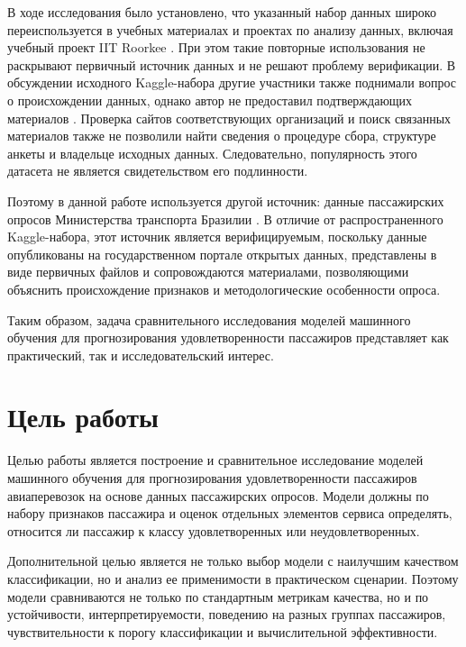 \documentclass[14pt,a4paper]{extreport}
\begin{document}
В ходе исследования было установлено, что указанный набор данных широко переиспользуется в учебных материалах и проектах по анализу данных, включая учебный проект IIT Roorkee \cite{iit-roorkee-project}. При этом такие повторные использования не раскрывают первичный источник данных и не решают проблему верификации. В обсуждении исходного Kaggle-набора другие участники также поднимали вопрос о происхождении данных, однако автор не предоставил подтверждающих материалов \cite{kaggle-source-discussion}. Проверка сайтов соответствующих организаций и поиск связанных материалов также не позволили найти сведения о процедуре сбора, структуре анкеты и владельце исходных данных. Следовательно, популярность этого датасета не является свидетельством его подлинности.

Поэтому в данной работе используется другой источник: данные пассажирских опросов Министерства транспорта Бразилии \cite{brazil-data}. В отличие от распространенного Kaggle-набора, этот источник является верифицируемым, поскольку данные опубликованы на государственном портале открытых данных, представлены в виде первичных файлов и сопровождаются материалами, позволяющими объяснить происхождение признаков и методологические особенности опроса.

Таким образом, задача сравнительного исследования моделей машинного обучения для прогнозирования удовлетворенности пассажиров представляет как практический, так и исследовательский интерес.

\section{Цель работы}
Целью работы является построение и сравнительное исследование моделей машинного обучения для прогнозирования удовлетворенности пассажиров авиаперевозок на основе данных пассажирских опросов. Модели должны по набору признаков пассажира и оценок отдельных элементов сервиса определять, относится ли пассажир к классу удовлетворенных или неудовлетворенных.

Дополнительной целью является не только выбор модели с наилучшим качеством классификации, но и анализ ее применимости в практическом сценарии. Поэтому модели сравниваются не только по стандартным метрикам качества, но и по устойчивости, интерпретируемости, поведению на разных группах пассажиров, чувствительности к порогу классификации и вычислительной эффективности.
\end{document}

